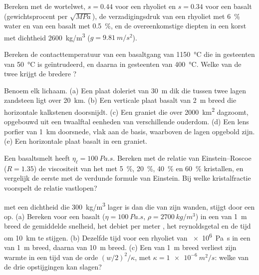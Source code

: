 \begin{exercise}[$\star$]\label{exo:b2:magma-emplacement:2}
Bereken met de wortelwet, $s = 0.44$ voor een rhyoliet en $s = 0.34$ voor een basalt
(gewichtsprocent per $\sqrt{\unit{MPa}}$), de verzadigingsdruk van een
rhyoliet met \qty{6}{\percent} water en van een basalt met \qty{0.5}{\percent},
en de overeenkomstige diepten in een korst met dichtheid \qty{2600}{kg/m^3}
($g = \qty{9.81}{m/s^2}$).
\end{exercise}

\begin{exercise}[$\star$]\label{exo:b2:magma-emplacement:3}
Bereken de contacttemperatuur van een basaltgang van \qty{1150}{\celsius}
die in gesteenten van \qty{50}{\celsius} is geïntrudeerd, en daarna in gesteenten van
\qty{400}{\celsius}. Welke van de twee  krijgt de bredere ?
\end{exercise}

\begin{exercise}[$\star$]\label{exo:b2:magma-emplacement:4}
Benoem elk lichaam. (a) Een plaat doleriet van \qty{30}{m} dik die tussen twee lagen
zandsteen ligt over \qty{20}{km}. (b) Een verticale plaat basalt van \qty{2}{m} breed
die horizontale kalkstenen doorsnijdt. (c) Een graniet die over \qty{2000}{km^2} dagzoomt,
opgebouwd uit een twaalftal eenheden van verschillende ouderdom. (d) Een lens porfier van \qty{1}{km} doorsnede,
vlak aan de basis, waarboven de lagen opgebold zijn. (e) Een horizontale plaat
basalt in een graniet.
\end{exercise}

\begin{exercise}[$\star\star$]\label{exo:b2:magma-emplacement:5}
Een basaltsmelt heeft $\eta_{\ell} = \qty{100}{Pa.s}$. Bereken met de relatie van
Einstein--Roscoe ($R = 1.35$) de viscositeit van het  met
\qty{5}{\percent}, \qty{20}{\percent}, \qty{40}{\percent} en \qty{60}{\percent}
kristallen, en vergelijk de eerste met de verdunde formule van Einstein. Bij welke
kristalfractie voorspelt de relatie vastlopen?
\end{exercise}

\begin{exercise}[$\star\star$]\label{exo:b2:magma-emplacement:6}
 met een dichtheid die \qty{300}{kg/m^3} lager is dan die van zijn wanden, stijgt door een  op.
(a) Bereken voor een basalt ($\eta = \qty{100}{Pa.s}$, $\rho = \qty{2700}{kg/m^3}$) in een 
van \qty{1}{m} breed de gemiddelde snelheid, het debiet per meter , het
reynoldsgetal en de tijd om \qty{10}{km} te stijgen. (b) Dezelfde tijd voor een rhyoliet van
\qty{e6}{Pa.s} in een  van \qty{1}{m} breed, daarna van \qty{10}{m} breed. (c) Een 
van \qty{1}{m} breed verliest zijn warmte in een tijd van de orde $(w/2)^2/\kappa$, met $\kappa =
\qty{1e-6}{m^2/s}$: welke van de drie opstijgingen kan slagen?
\end{exercise}

